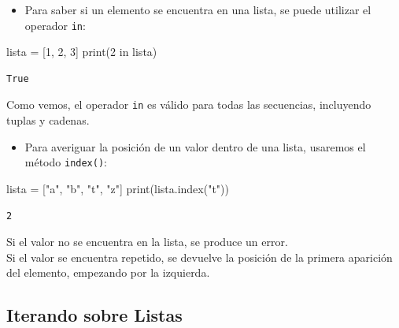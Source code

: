 \documentclass[
  letterpaper,
  DIV=11,
  numbers=noendperiod]{scrreprt}
\newenvironment{Shaded}{\begin{snugshade}}{\end{snugshade}}
\newcommand{\BuiltInTok}[1]{\textcolor[rgb]{0.00,0.23,0.31}{#1}}
\newcommand{\DecValTok}[1]{\textcolor[rgb]{0.68,0.00,0.00}{#1}}
\newcommand{\KeywordTok}[1]{\textcolor[rgb]{0.00,0.23,0.31}{#1}}
\newcommand{\NormalTok}[1]{\textcolor[rgb]{0.00,0.23,0.31}{#1}}
\newcommand{\OperatorTok}[1]{\textcolor[rgb]{0.37,0.37,0.37}{#1}}
\newcommand{\StringTok}[1]{\textcolor[rgb]{0.13,0.47,0.30}{#1}}
\providecommand{\tightlist}{%
  \setlength{\itemsep}{0pt}\setlength{\parskip}{0pt}}\usepackage{longtable,booktabs,array}
\begin{document}
\begin{itemize}
\tightlist
\item
  Para saber si un elemento se encuentra en una lista, se puede utilizar
  el operador \texttt{in}:
\end{itemize}

\begin{Shaded}
\begin{Highlighting}[]
\NormalTok{lista }\OperatorTok{=}\NormalTok{ [}\DecValTok{1}\NormalTok{, }\DecValTok{2}\NormalTok{, }\DecValTok{3}\NormalTok{]}
\BuiltInTok{print}\NormalTok{(}\DecValTok{2} \KeywordTok{in}\NormalTok{ lista)}
\end{Highlighting}
\end{Shaded}

\begin{verbatim}
True
\end{verbatim}

Como vemos, el operador \texttt{in} es válido para todas las secuencias,
incluyendo tuplas y cadenas.

\begin{itemize}
\tightlist
\item
  Para averiguar la posición de un valor dentro de una lista, usaremos
  el método \texttt{index()}:
\end{itemize}

\begin{Shaded}
\begin{Highlighting}[]
\NormalTok{lista }\OperatorTok{=}\NormalTok{ [}\StringTok{"a"}\NormalTok{, }\StringTok{"b"}\NormalTok{, }\StringTok{"t"}\NormalTok{, }\StringTok{"z"}\NormalTok{]}
\BuiltInTok{print}\NormalTok{(lista.index(}\StringTok{"t"}\NormalTok{))}
\end{Highlighting}
\end{Shaded}

\begin{verbatim}
2
\end{verbatim}

Si el valor no se encuentra en la lista, se produce un error.\\
Si el valor se encuentra repetido, se devuelve la posición de la primera
aparición del elemento, empezando por la izquierda.

\hypertarget{iterando-sobre-listas}{%
\subsection{Iterando sobre Listas}\label{iterando-sobre-listas}}
\end{document}
